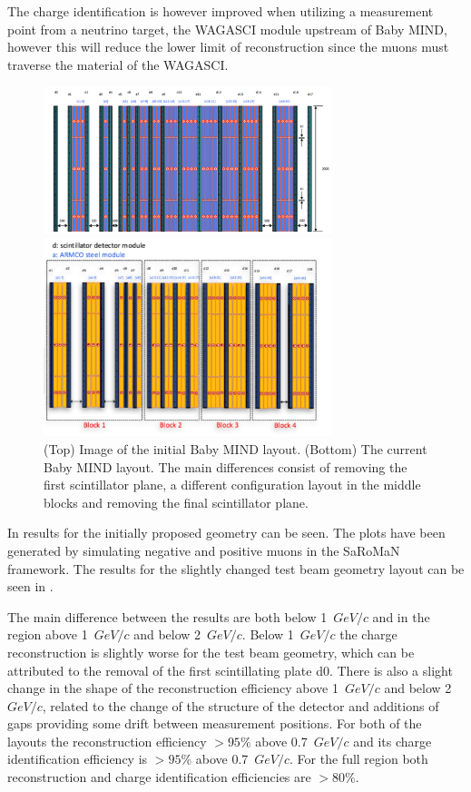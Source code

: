 The charge identification is however improved when utilizing a measurement point from a neutrino target, the WAGASCI module upstream of Baby MIND, however this will reduce the lower limit of reconstruction since the muons must traverse the material of the WAGASCI. 

\begin{figure}[h!]
\centering
\includegraphics[width=0.75\textwidth]{figures/oldStudies/oldMIND.png}

\includegraphics[width=0.75\textwidth]{figures/MIND.jpeg}
\caption{(Top) Image of the initial Baby MIND layout. (Bottom) The current Baby MIND layout. The main differences consist of removing the first scintillator plane, a different configuration layout in the middle blocks and removing the final scintillator plane.}
\label{fig:oldMIND}
\end{figure}

In  results for the initially proposed geometry can be seen. The plots have been generated by simulating negative and positive muons in the SaRoMaN framework. The results for the slightly changed test beam geometry layout can be seen in  . 

The main difference between the results are both below 1~$GeV/c$ and in the region above 1~$GeV/c$ and below 2~$GeV/c$. Below 1~$GeV/c$ the charge reconstruction is slightly worse for the test beam geometry, which can be attributed to the removal of the first scintillating plate d0. There is also a slight change in the shape of the reconstruction efficiency above 1~$GeV/c$ and below 2~$GeV/c$, related to the change of the structure of the detector and additions of gaps providing some drift between measurement positions. For both of the layouts the reconstruction efficiency $> 95\%$ above 0.7~$GeV/c$ and its charge identification efficiency is $> 95\%$ above 0.7~$GeV/c$. For the full region both reconstruction and charge identification efficiencies are $> 80\% $. 

